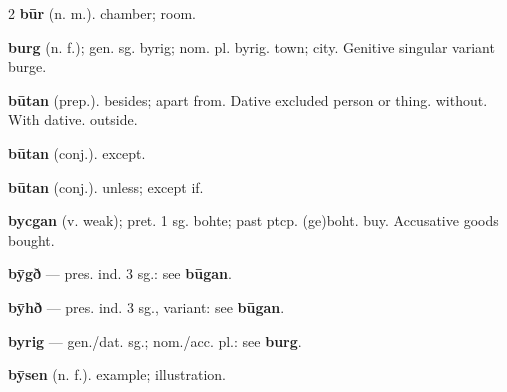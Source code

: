 \begin{multicols*}{2}
\textbf{būr} (n. m.). chamber; room.\par
\textbf{burg} (n. f.); gen. sg. byrig; nom. pl. byrig. town; city. Genitive singular variant burge.\par
\textbf{būtan} (prep.). besides; apart from. Dative excluded person or thing. without. With dative. outside.\par
\textbf{būtan} (conj.). except.\par
\textbf{būtan} (conj.). unless; except if.\par
\textbf{bycgan} (v. weak); pret. 1 sg. bohte; past ptcp. (ge)boht. buy. Accusative goods bought.\par
\textbf{bȳgð} — pres. ind. 3 sg.: see \textbf{būgan}.\par
\textbf{bȳhð} — pres. ind. 3 sg., variant: see \textbf{būgan}.\par
\textbf{byrig} — gen./dat. sg.; nom./acc. pl.: see \textbf{burg}.\par
\textbf{bȳsen} (n. f.). example; illustration.\par

\end{multicols*}
